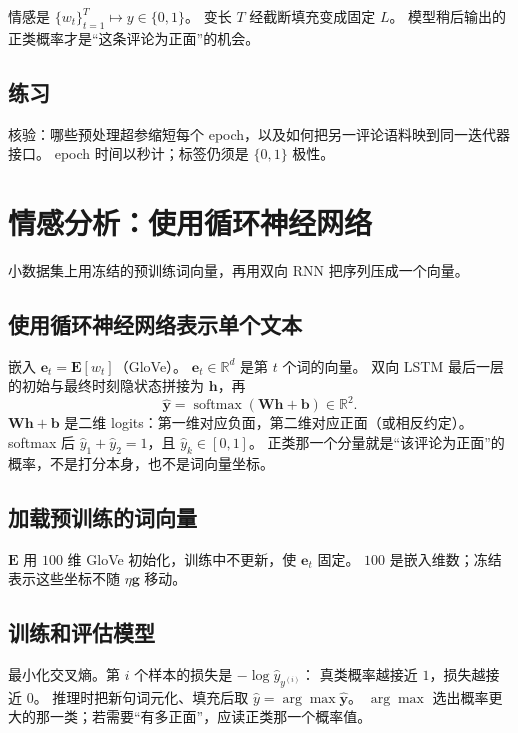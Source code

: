 情感是
$\{w_t\}_{t=1}^{T}\mapsto y\in\{0,1\}$。
变长 $T$ 经截断填充变成固定 $L$。
模型稍后输出的正类概率才是“这条评论为正面”的机会。

\subsection{练习}

核验：哪些预处理超参缩短每个 epoch，以及如何把另一评论语料映到同一迭代器接口。
epoch 时间以秒计；标签仍须是 $\{0,1\}$ 极性。

\section{情感分析：使用循环神经网络}



小数据集上用冻结的预训练词向量，再用双向 RNN 把序列压成一个向量。

\subsection{使用循环神经网络表示单个文本}

嵌入 $\bm{e}_t=\bm{E}[w_t]$（GloVe）。
$\bm{e}_t\in\mathbb{R}^{d}$ 是第 $t$ 个词的向量。
双向 LSTM 最后一层的初始与最终时刻隐状态拼接为 $\bm{h}$，再
\[
\hat{\bm{y}}=\operatorname{softmax}(\bm{W}\bm{h}+\bm{b})\in\mathbb{R}^{2}.
\]
$\bm{W}\bm{h}+\bm{b}$ 是二维 logits：第一维对应负面，第二维对应正面（或相反约定）。
softmax 后 $\hat y_1+\hat y_2=1$，且 $\hat y_k\in[0,1]$。
正类那一个分量就是“该评论为正面”的概率，不是打分本身，也不是词向量坐标。

\subsection{加载预训练的词向量}

$\bm{E}$ 用 $100$ 维 GloVe 初始化，训练中不更新，使 $\bm{e}_t$ 固定。
$100$ 是嵌入维数；冻结表示这些坐标不随 $\eta\bm{g}$ 移动。

\subsection{训练和评估模型}

最小化交叉熵。第 $i$ 个样本的损失是 $-\log\hat y_{y^{(i)}}$：
真类概率越接近 $1$，损失越接近 $0$。
推理时把新句词元化、填充后取 $\hat y=\arg\max\hat{\bm{y}}$。
$\arg\max$ 选出概率更大的那一类；若需要“有多正面”，应读正类那一个概率值。

